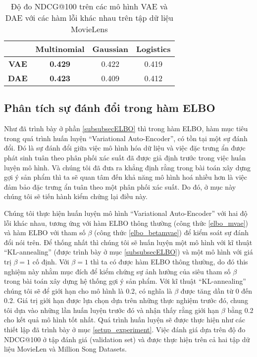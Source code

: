     \begin{table}[]
    \centering
        \begin{tabular}{|c|c|c|c|}
        \hline
                        & \textbf{Multinomial}                  & \textbf{Gaussian}            & \textbf{Logistics}           \\ \hline
        \textbf{VAE} &  \textbf{0.429} & 0.422 &  0.419 \\ \hline
        \textbf{DAE}  & \textbf{0.423}                        & 0.409                        & 0.412                        \\ \hline
        \end{tabular}
    
    \caption[Kết quả mô hình với các hàm lỗi khác nhau]{Độ đo NDCG@100 trên các mô hình VAE và DAE với các hàm lỗi khác nhau trên tập dữ liệu MovieLens}
    \label{table:comparell}
    \end{table}   
   
   \subsection{Phân tích sự đánh đổi trong hàm ELBO}
   Như đã trình bày ở phần \ref{subsubsecELBO} thì trong hàm ELBO, hàm mục tiêu trong quá trình huấn luyện ``Variational Auto-Encoder'', có tồn tại một sự đánh đổi.
   Đó là sự đánh đổi giữa việc mô hình hóa dữ liệu và việc đặc trưng ẩn được phát sinh tuân theo phân phối xác suất đã được giả định trước trong việc huấn luyện mô hình.
   Và chúng tôi đã đưa ra khẳng định rằng trong bài toán xây dựng gợi ý sản phẩm thì ta sẽ quan tâm đến khả năng mô hình hoá nhiều hơn là việc đảm bảo đặc trưng ẩn tuân theo một phân phối xác suất.
   Do đó, ở mục này chúng tôi sẽ tiến hành kiểm chứng lại điều này.

   Chúng tôi thực hiện huấn luyện mô hình ``Variational Auto-Encoder'' với hai độ lỗi khác nhau, tương ứng với hàm ELBO thông thường (công thức \ref{elbo_mvae}) và hàm ELBO với tham số $\beta$ (công thức \ref{elbo_betamvae}) để kiểm soát sự đánh đổi nói trên.
   Để thống nhất thì chúng tôi sẽ huấn luyện một mô hình với kĩ thuật ``KL-annealing'' (được trình bày ở mục \ref{subsubsecELBO}) và một mô hình với giá trị $\beta =1$ cố định.
   Với $\beta = 1$ thì ta có được hàm ELBO thông thường, do đó this nghiệm này nhằm mục đích để kiểm chứng sự ảnh hưởng của siêu tham số $\beta$ trong bài toán xây dựng hệ thống gợi ý sản phẩm.
   Với kĩ thuật ``KL-annealing'' chúng tôi sẽ để giới hạn cho mô hình là 0.2, có nghĩa là $\beta$ được tăng dần từ 0 đến 0.2.
   Giá trị giới hạn được lựa chọn dựa trên những thực nghiệm trước đó, chung tôi dựa vào những lần huấn luyện trước đó và nhận thấy rằng giới hạn $\beta$ bằng 0.2 cho kết quả mô hình tốt nhất.
   Quá trình huấn luyện sẽ được thực hiện như các thiết lập đã trình bày ở mục \ref{setup_experiment}.
   Việc đánh giá dựa trên độ đo NDCG@100 ở tập đánh giá (validation set) và được thực hiện trên cả hai tập dữ liệu MovieLen và Million Song Datasets.
   
